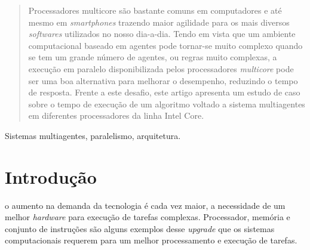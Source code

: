 \documentclass[conference]{IEEEtran}
\begin{document}
\begin{abstract}
Processadores multicore são bastante comuns em computadores e até mesmo em \textit{smartphones} trazendo maior agilidade para os mais diversos \textit{softwares} utilizados no nosso dia-a-dia. Tendo em vista que um ambiente computacional baseado em agentes pode tornar-se muito complexo quando se tem um grande número de agentes, ou regras muito complexas, a execução em paralelo disponibilizada pelos processadores \textit{multicore} pode ser uma boa alternativa para melhorar o desempenho, reduzindo o tempo de resposta. Frente a este desafio, este artigo apresenta um estudo de caso sobre o tempo de execução de um algoritmo voltado a sistema multiagentes em diferentes processadores da linha Intel Core.
\end{abstract}

\begin{IEEEkeywords}
Sistemas multiagentes, paralelismo, arquitetura.
\end{IEEEkeywords}






%
\IEEEpeerreviewmaketitle



\section{Introdução}
     o aumento na demanda da tecnologia é cada vez maior, a necessidade de um melhor \textit{hardware} para execução de tarefas complexas. Processador, memória e conjunto de instruções são alguns exemplos desse \textit{upgrade} que os sistemas computacionais requerem para um melhor processamento e execução de tarefas.
        
\end{document}
